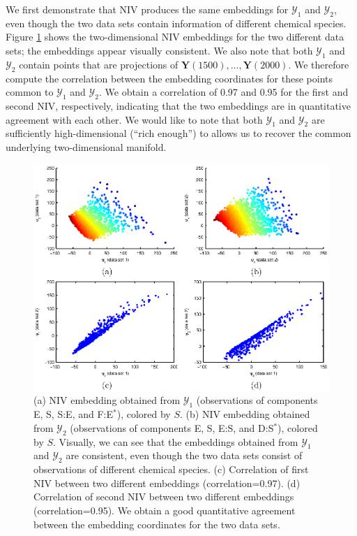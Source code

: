 We first demonstrate that NIV produces the same embeddings for $\mathcal{Y}_1$ and $\mathcal{Y}_2$, even though the two data sets contain information of different chemical species.
%
Figure \ref{fig:rxn_embedding} shows the two-dimensional NIV embeddings for the two different data sets; the embeddings appear visually consistent.
%
We also note that both $\mathcal{Y}_1$ and $\mathcal{Y}_2$ contain points that are projections of $\mathbf{Y}(1500), \dots, \mathbf{Y}(2000)$.
%
We therefore compute the correlation between the embedding coordinates for these points common to $\mathcal{Y}_1$ and $\mathcal{Y}_2$.
%
We obtain a correlation of 0.97 and 0.95 for the first and second NIV, respectively, indicating that the two embeddings are in quantitative
agreement with each other.
%
We would like to note that both $\mathcal{Y}_1$ and $\mathcal{Y}_2$ are sufficiently high-dimensional (``rich enough'') to allows us to recover
the common underlying two-dimensional manifold.
%
\begin{figure}[t]
    \includegraphics[width=6in]{fig4}
    \caption[Intrinsic variable embeddings for chemical reaction network data]{(a) NIV embedding obtained from $\mathcal{Y}_1$ (observations of components E, S, S:E, and F:E$^{*}$), colored by $S$. (b) NIV embedding obtained from $\mathcal{Y}_2$ (observations of components E, S, E:S, and D:S$^{*}$), colored by $S$. Visually, we can see that the embeddings obtained from $\mathcal{Y}_1$ and $\mathcal{Y}_2$ are consistent, even though the two data sets consist of observations of different chemical species. (c) Correlation of first NIV between two different embeddings (correlation=0.97). (d)  Correlation of second NIV between two different embeddings (correlation=0.95). We obtain a good quantitative agreement between the embedding coordinates for the two data sets.}
    \label{fig:rxn_embedding}
\end{figure}

